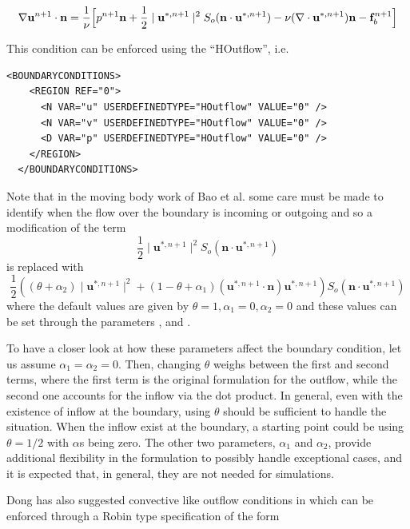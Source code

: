  \begin{equation}
 \nabla\mathbf{u}^{n+1}\cdot\mathbf{n}=\frac{1}{\nu}\Bigl[p^{n+1}\mathbf{n}+\frac{1}{2}
   \mid \mathbf{u}^{*,n+1} \mid^2 S_o(\mathbf{n}\cdot
   \mathbf{u}^{*,n+1})-\nu(\nabla\cdot\mathbf{u}^{*,n+1})\mathbf{n}-\mathbf{f}_b^{n+1}\Bigr]
 \end{equation}

This condition can be enforced using the  ``HOutflow'', i.e. 
\begin{lstlisting}[style=XMLStyle]
  <BOUNDARYCONDITIONS>
    <REGION REF="0">
      <N VAR="u" USERDEFINEDTYPE="HOutflow" VALUE="0" />
      <N VAR="v" USERDEFINEDTYPE="HOutflow" VALUE="0" />
      <D VAR="p" USERDEFINEDTYPE="HOutflow" VALUE="0" />
    </REGION>
  </BOUNDARYCONDITIONS>
\end{lstlisting}

Note that in the moving body work of Bao et al. \cite{BaPlGrSh16}
some care must be made to identify when the flow over the boundary is
incoming or outgoing and so a modification of the term
\[
\frac{1}{2}
   \mid \mathbf{u}^{*,n+1} \mid^2 S_o(\mathbf{n}\cdot
   \mathbf{u}^{*,n+1})
\]
is replaced with
\[
   \frac{1}{2} \left ( (\theta + \alpha_2)
   \mid \mathbf{u}^{*,n+1} \mid^2 + (1-\theta + \alpha_1) 
( \mathbf{u}^{*,n+1} \cdot \mathbf{n})  \mathbf{u}^{*,n+1} \right )
   S_o(\mathbf{n}\cdot
   \mathbf{u}^{*,n+1})
\]
where the default values are given by $\theta = 1,\alpha_1 = 0,\alpha_2 = 0$ and these values can be set through the parameters ,
 and .  

To have a closer look at how these parameters affect the boundary condition, let us assume $\alpha_1=\alpha_2=0$. Then, changing $\theta$ weighs between the first and second terms, where the first term is the original formulation for the outflow, while the second one accounts for the inflow via the dot product. In general, even with the existence of inflow at the boundary, using $\theta$ should be sufficient to handle the situation. When the inflow exist at the boundary, a starting point could be using $\theta=1/2$ with $\alpha$s being zero. The other two parameters, $\alpha_1$ and $\alpha_2$, provide additional flexibility in the formulation to possibly handle exceptional cases, and it is expected that, in general, they are not needed for simulations.

Dong has also suggested convective like outflow conditions in
\cite{Dong15} which can be enforced through a Robin type specification
of the form

